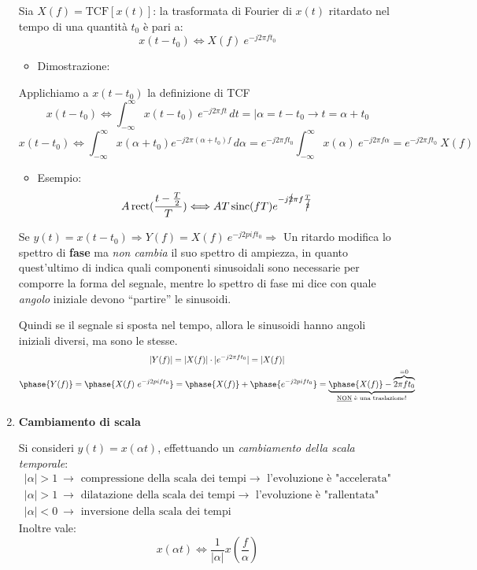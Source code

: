 \documentclass[
  paper=a4,
  ,captions=tableheading
]{scrartcl}
\providecommand{\tightlist}{%
  \setlength{\itemsep}{0pt}\setlength{\parskip}{0pt}}
\begin{document}
\begin{enumerate}
  Sia \(X(f)=\text{TCF}[x(t)]\): la trasformata di Fourier di \(x(t)\)
  ritardato nel tempo di una quantità \(t_0\) è pari a: \[
  x(t-t_0) \Longleftrightarrow X(f) \ e^{-j2\pi ft_0}
  \]

  \begin{itemize}
  \tightlist
  \item
    Dimostrazione:
  \end{itemize}

  Applichiamo a \(x(t-t_0)\) la definizione di TCF \[
  x(t-t_0) \Longleftrightarrow \int_{-\infty}^{\infty} x(t-t_0) \ e^{-j2\pi ft} \,dt = \Big|\alpha = t-t_0 \to t=\alpha +t_0
  \] \[
  x(t-t_0) \Longleftrightarrow \int_{-\infty}^{\infty} x(\alpha + t_0) e^{-j2\pi (\alpha +t_0)f} \,d\alpha = e^{-j2\pi ft_0} \int_{-\infty}^{\infty} x(\alpha)\ e^{-j2\pi f\alpha} =  e^{-j2\pi ft_0} \ X(f) 
  \]

  \begin{itemize}
  \tightlist
  \item
    Esempio: \[
    A\mathop{\mathrm{rect}}(\frac{t-\frac{T}{2}}{T}) \Longleftrightarrow AT\mathop{\mathrm{sinc}}(fT)e^{-j\cancel{2}\pi f\frac{T}{\cancel{2}}}
    \]
  \end{itemize}

  Se
  \(y(t)=x(t-t_0) \Rightarrow Y(f) = X(f) \ e^{-j2 pi ft_0} \Rightarrow\)
  Un ritardo modifica lo spettro di \textbf{fase} ma \emph{non cambia}
  il suo spettro di ampiezza, in quanto quest'ultimo di indica quali
  componenti sinusoidali sono necessarie per comporre la forma del
  segnale, mentre lo spettro di fase mi dice con quale \emph{angolo}
  iniziale devono ``partire'' le sinusoidi.

  Quindi se il segnale si sposta nel tempo, allora le sinusoidi hanno
  angoli iniziali diversi, ma sono le stesse. \begin{gather*}
  |Y(f)| = |X(f)|\cdot |e^{-j2\pi ft_0}| = |X(f)| \\
  \phase{Y(f)} = \phase{X(f) \ e^{-j2 pi ft_0}} = \phase{X(f)} + \phase{e^{-j2 pi ft_0}} = \underbrace{\phase{X(f)} - \overbrace{2\pi ft_0}^{=0}}_{\text{\underline{NON} è una traslazione!}}
  \end{gather*}
\item
  \textbf{Cambiamento di scala}

  Si consideri \(y(t)=x(\alpha t)\), effettuando un \emph{cambiamento
  della scala temporale}: \[
  \begin{array}{cl}
  |\alpha | > 1 \ \to \text{ compressione della scala dei tempi} \to \text{ l'evoluzione è "accelerata"}\\
  |\alpha | > 1 \ \to \text{ dilatazione della scala dei tempi} \to \text{ l'evoluzione è "rallentata"}\\
  |\alpha | < 0 \ \to \text{ inversione della scala dei tempi}
  \end{array} 
  \] Inoltre vale: \[
  x(\alpha t) \Longleftrightarrow \frac{1}{|\alpha |} x(\frac{f}{\alpha})
  \]


\end{enumerate}
\end{document}
